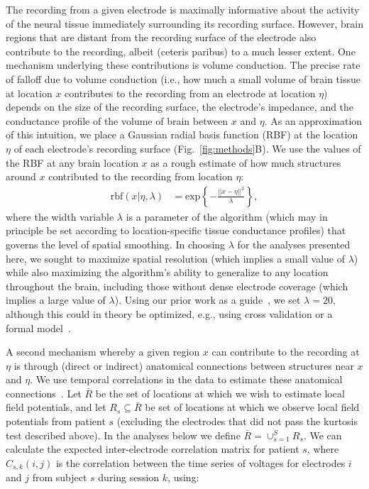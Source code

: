 \documentclass[11pt]{article}
\begin{document}
The recording from a given electrode is maximally informative about
the activity of the neural tissue immediately surrounding its
recording surface.  However, brain regions that are distant from the
recording surface of the electrode also contribute to the recording,
albeit (ceteris paribus) to a much lesser extent.  One mechanism
underlying these contributions is volume conduction.  The precise rate
of falloff due to volume conduction (i.e., how much a small volume of
brain tissue at location $x$ contributes to the recording from an
electrode at location $\eta$) depends on the size of the recording
surface, the electrode's impedance, and the conductance profile of the
volume of brain between $x$ and $\eta$.  As an approximation of this
intuition, we place a Gaussian radial basis function (RBF) at the
location $\eta$ of each electrode's recording surface
(Fig.~\ref{fig:methods}B).  We use the values of the RBF at any brain
location $x$ as a rough estimate of how much structures around $x$
contributed to the recording from location $\eta$:
\begin{align}
  \mathrm{rbf}(x|\eta,\lambda) & =
  \mathrm{exp}\left\{ -\frac{||x - \eta||^2}{\lambda} \right\},\label{eqn:rbf}
\end{align}
where the width variable $\lambda$ is a parameter of the algorithm
(which may in principle be set according to location-specific tissue
conductance profiles) that governs the level of spatial smoothing.  In
choosing $\lambda$ for the analyses presented here, we sought to
maximize spatial resolution (which implies a small value of $\lambda$)
while also maximizing the algorithm's ability to generalize to any
location throughout the brain, including those without dense electrode
coverage (which implies a large value of $\lambda$). Using our prior
work as a guide~\citep{MannEtal14b, MannEtal18}, we set $\lambda = 20$,
although this could in theory be optimized, e.g., using cross
validation or a formal model~\citep[e.g.,][]{MannEtal18}.

A second mechanism whereby a given region $x$ can contribute to the
recording at $\eta$ is through (direct or indirect) anatomical
connections between structures near $x$ and $\eta$.  We use temporal
correlations in the data to estimate these anatomical
connections~\citep{BeckEtal18}.  Let $\bar{R}$ be the set of locations
at which we wish to estimate local field potentials, and let
$R_{s} \subseteq \bar{R}$ be set of locations at which we observe local
field potentials from patient $s$ (excluding the electrodes that did
not pass the kurtosis test described above). In the analyses below we
define $\bar{R} = \cup_{s=1}^S R_s$.  We can calculate the expected
inter-electrode correlation matrix for patient $s$, where
$C_{s,k}(i,j)$ is the correlation between the time series of voltages
for electrodes $i$ and $j$ from subject $s$ during session $k$, using:
\end{document}
